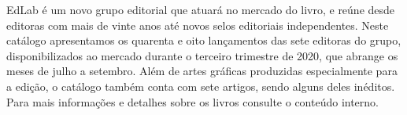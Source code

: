 \blankpage
\pagestyle{indice}

{}

\vspace{2.2cm}

{}


\hspace*{-7cm}\hrulefill\hspace*{-7cm}

\vspace{1cm}

\hspace*{-.5cm}\parbox{150pt}{\raggedright EdLab é um novo grupo editorial que atuará no mercado do livro, e reúne desde editoras com mais de vinte anos até novos selos editoriais independentes. Neste catálogo apresentamos os quarenta e oito lançamentos das sete editoras do grupo, disponibilizados ao mercado durante o terceiro trimestre de 2020, que abrange os meses de julho a setembro. Além de artes gráficas produzidas especialmente para a edição, o catálogo também conta com sete artigos, sendo alguns deles inéditos. Para mais informações e detalhes sobre os livros consulte o conteúdo interno.} %

